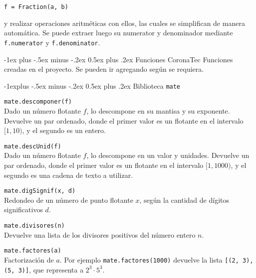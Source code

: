 \documentclass[10pt,landscape]{article}
\makeatletter
\renewcommand{\section}{\@startsection{section}{1}{0mm}%
                                {-1ex plus -.5ex minus -.2ex}%
                                {0.5ex plus .2ex}%
                                {\normalfont\large\bfseries}}
\renewcommand{\subsection}{\@startsection{subsection}{2}{0mm}%
                                {-1explus -.5ex minus -.2ex}%
                                {0.5ex plus .2ex}%
                                {\normalfont\normalsize\bfseries}}
\makeatother
\begin{document}
\begin{multicols}{3}
\verb|f = Fraction(a, b)|

y realizar operaciones aritm\'eticas con ellos, las cuales se simplifican de manera autom\'atica. Se puede extraer luego su numerator y denominador mediante \verb|f.numerator| y \verb|f.denominator|.

\section{Funciones CoronaTec}
Funciones creadas en el proyecto. Se pueden ir agregando seg\'un se requiera.

\subsection{Biblioteca \texttt{mate}}
\begin{asparaitem}
\item \verb|mate.descomponer(f)| \\
  \quad Dado un n\'umero flotante $f$, lo descompone en su mantisa y su exponente. Devuelve un par ordenado, donde el primer valor es un flotante en el intervalo $[1, 10)$, y el segundo es un entero.

\item \verb|mate.descUnid(f)| \\
  \quad Dado un n\'umero flotante $f$, lo descompone en un valor y unidades. Devuelve un par ordenado, donde el primer valor es un flotante en el intervalo $[1, 1000)$, y el segundo es una cadena de texto a utilizar.

\item \verb|mate.digSignif(x, d)| \\
  \quad Redondeo de un n\'umero de punto flotante $x$, seg\'un la cantidad de d\'igitos significativos $d$.

\item \verb|mate.divisores(n)| \\
  \quad Devuelve una lista de los divisores positivos del n\'umero entero $n$.

  \item \verb|mate.factores(a)| \\
\quad Factorización de $a$. Por ejemplo \verb|mate.factores(1000)| devuelve la lista \verb|[(2, 3), (5, 3)]|, que representa a $2^3\cdot 5^3$.

\end{asparaitem}


\end{multicols}
\end{document}
